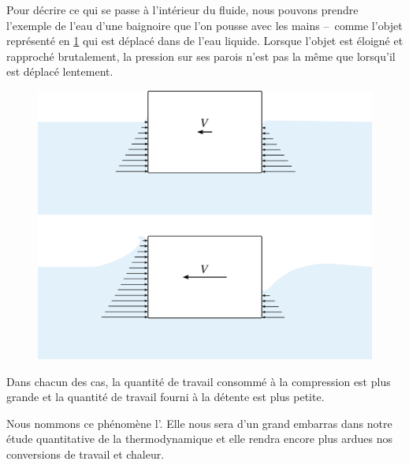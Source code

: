 		Pour décrire ce qui se passe à l’intérieur du fluide, nous pouvons prendre l’exemple de l’eau d’une baignoire que l’on pousse avec les mains --\ comme l’objet représenté en \cref{fig_baignoire} qui est déplacé dans de l’eau liquide. Lorsque l’objet est éloigné et rapproché brutalement, la pression sur ses parois n’est pas la même que lorsqu’il est déplacé lentement.

		\begin{figure}[htb!]%
			\begin{center}
				\includegraphics[width=\textwidth]{images/mouvement_rapide_niveau_eau.png}
			\end{center}
			\label{fig_baignoire}
		\end{figure}
		
		\onlyframabook{\clearfloats\clearpage\pagebreak\par}%
		Dans chacun des cas, la quantité de travail consommé à la compression est plus grande et la quantité de travail fourni à la détente est plus petite.
		
		Nous nommons ce phénomène l’. Elle nous sera d’un grand embarras dans notre étude quantitative de la thermodynamique et elle rendra encore plus ardues nos conversions de travail et chaleur.


